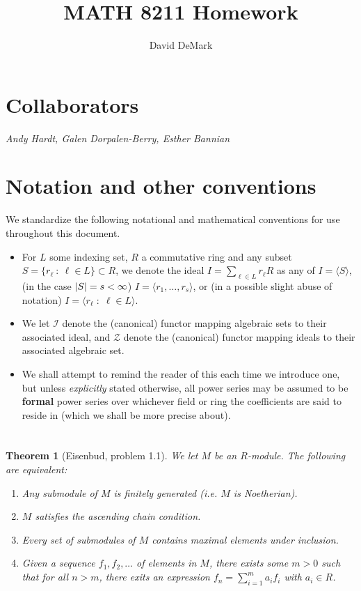 \documentclass[english]{article}
\title{MATH 8211 Homework}
\author{David DeMark}
\date{\due}
\DeclarePairedDelimiter\abs{\lvert}{\rvert}%
\newcommand{\prob}[1]{\setcounter{section}{#1-1}\section{}}
\newtheorem*{theorem*}{Theorem}
\theoremstyle{remark}
\theoremstyle{definition}
\newcommand{\ddi}{\todo[inline]}
\newcommand{\gen}[1]{\langle #1 \rangle}
\newcommand{\genb}[2]{\langle #1\;:\;#2 \rangle}
\newcommand{\setc}[2]{\{ #1\::\:#2 \}}
\begin{document}
	\maketitle
	\section*{Collaborators}
	\textit{Andy Hardt, Galen Dorpalen-Berry, Esther Bannian}
	\section*{Notation and other conventions}
	We standardize the following notational and mathematical conventions for use throughout this document. \begin{itemize}
		\item For $L$ some indexing set, $R$ a commutative ring and any subset $S=\setc{r_\ell}{\ell\in L }\subset R$, we denote the ideal $I=\sum_{\ell \in L} r_\ell R$ as any of $I=\gen{S}$, (in the case $\abs{S}=s<\infty$) $I=\gen{r_1,\hdots, r_s}$, or (in a possible slight abuse of notation) $I=\genb{r_\ell}{\ell\in L}$.
		\item We let $\mathcal{I}$ denote the (canonical) functor mapping algebraic sets to their associated ideal, and $\mathcal{Z}$ denote the (canonical) functor mapping ideals to their associated algebraic set.\ddi{are these actual functors}
		\item We shall attempt to remind the reader of this each time we introduce one, but unless \emph{explicitly} stated otherwise, all power series may be assumed to be \textbf{formal} power series over whichever field or ring the coefficients are said to reside in (which we shall be more precise about). 
	\end{itemize}
\prob{1}
\begin{theorem*}[Eisenbud, problem 1.1]
 We let $M$ be an $R$-module. The following are equivalent:\begin{enumerate}[label=\emph{(\roman*)}]
 	\item Any submodule of $M$ is finitely generated (i.e. $M$ is Noetherian).
 	\item $M$ satisfies the ascending chain condition.
 	\item Every set of submodules of $M$ contains maximal elements under inclusion. 
 	\item Given a sequence $f_1,f_2,\hdots$ of elements in $M$, there exists some $m>0$ such that for all $n>m$, there exits an expression $f_n=\sum_{i=1}^m a_i f_i$ with $a_i\in R$. 
 \end{enumerate}
\end{theorem*}
\end{document}
